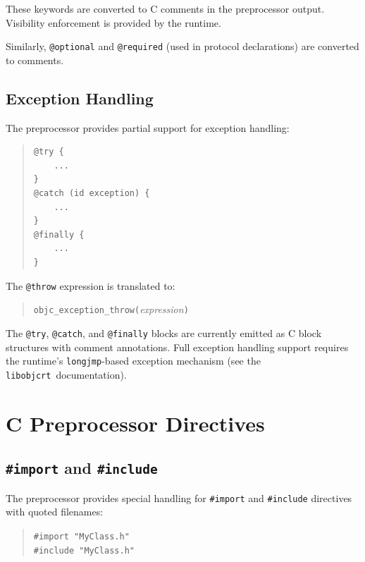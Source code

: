 \documentclass[11pt,twoside]{article}
\newcommand{\libobjcrt}{{\tt libobjcrt}}
\newcommand{\meta}[1]{{\itshape #1}}
\begin{document}
These keywords are converted to C comments in the preprocessor output.
Visibility enforcement is provided by the runtime.

Similarly, {\tt @optional} and {\tt @required} (used in protocol
declarations) are converted to comments.

\subsection{Exception Handling}

The preprocessor provides partial support for exception handling:
\begin{quote}
\begin{verbatim}
@try {
    ...
}
@catch (id exception) {
    ...
}
@finally {
    ...
}
\end{verbatim}
\end{quote}

The {\tt @throw} expression is translated to:
\begin{quote}
{\tt objc\_exception\_throw(}{\meta{expression}}{\tt )}
\end{quote}

The {\tt @try}, {\tt @catch}, and {\tt @finally} blocks are currently
emitted as C block structures with comment annotations.  Full exception
handling support requires the runtime's {\tt longjmp}-based exception
mechanism (see the \libobjcrt\ documentation).

\newpage
\section{C Preprocessor Directives}

\subsection{{\tt \#import} and {\tt \#include}}

The preprocessor provides special handling for {\tt \#import} and
{\tt \#include} directives with quoted filenames:
\begin{quote}
{\tt \#import "MyClass.h"}\\
{\tt \#include "MyClass.h"}
\end{quote}
\end{document}
